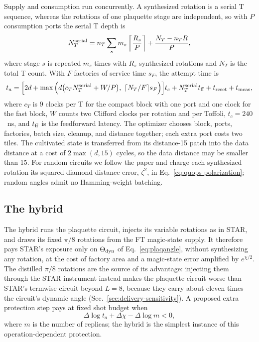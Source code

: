 \documentclass[11pt]{article}
\begin{document}
Supply and consumption run concurrently. A synthesized rotation is a serial T
sequence, whereas the rotations of one plaquette stage are independent, so
with $P$ consumption ports the serial T depth is
\begin{equation}\label{eq:serial-t}
 N_T^{\rm serial}=n_T\sum_s m_s\left\lceil\frac{R_s}{P}\right\rceil
 +\frac{N_T-n_TR}{P},
\end{equation}
where stage $s$ is repeated $m_s$ times with $R_s$ synthesized rotations and
$N_T$ is the total T count. With $F$ factories of service time $s_F$, the
attempt time is
\begin{equation}\label{eq:ft-time}
 t_a=\Big[2d+\max\Big(d\big(c_TN_T^{\rm serial}+W/P\big),\ \lceil N_T/F\rceil s_F\Big)\Big]t_c
 +N_T^{\rm serial}t_{\rm ff}+t_{\rm reset}+t_{\rm meas},
\end{equation}
where $c_T$ is 9 clocks per T for the compact block with one port and one
clock for the fast block, $W$ counts two Clifford clocks per rotation and per
Toffoli, $t_c=240$~ns, and $t_{\rm ff}$ is the feedforward latency. The optimizer chooses block, ports, factories, batch size, cleanup,
and distance together; each extra port costs two tiles. The cultivated state
is transferred from its distance-15 patch into the data distance at a cost of
$2\max(d,15)$ cycles, so the data distance may be smaller than 15. For random
circuits we follow the paper and charge each synthesized rotation its squared
diamond-distance error, $\zeta^2$, in Eq.~\eqref{eq:quops-polarization}; random
angles admit no Hamming-weight batching.

\subsection{The hybrid}\label{sec:hybrid}
The hybrid runs the plaquette circuit, injects its variable rotations as in
STAR, and draws its fixed $\pi/8$ rotations from the FT magic-state supply.
It therefore pays STAR's exposure only on $\Theta_{\rm dyn}$ of
Eq.~\eqref{eq:plaqangle}, without synthesizing any rotation, at the cost of
factory area and a magic-state error amplified by $e^{\chi/2}$. The distilled
$\pi/8$ rotations are the source of its advantage: injecting them through the
STAR instrument instead makes the plaquette circuit worse than STAR's termwise
circuit beyond $L=8$, because they carry about eleven times the circuit's
dynamic angle (Sec.~\ref{sec:delivery-sensitivity}). A proposed
extra protection step pays at fixed shot budget when
\begin{equation}\label{eq:hybrid}
 \Delta\log t_a+\Delta\chi-\Delta\log m<0,
\end{equation}
where $m$ is the number of replicas; the hybrid is the simplest instance of
this operation-dependent protection.
\end{document}
